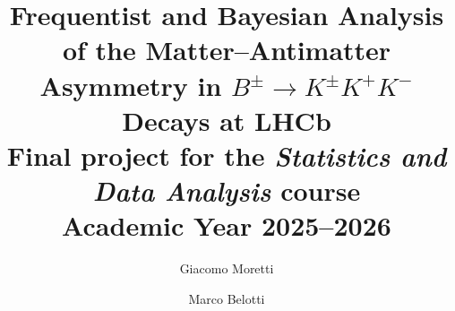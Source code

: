 \documentclass[%
 reprint,
 nofootinbib,
 amsmath,amssymb,
 aps,
 floatfix,
]{revtex4-2}
\begin{document}
\pagestyle{plain}

\title{Frequentist and Bayesian Analysis of the Matter--Antimatter Asymmetry in $B^{\pm} \to K^{\pm} K^{+} K^{-}$ Decays at LHCb\\[2.0ex]
\small Final project for the \textit{Statistics and Data Analysis} course\\
\small Academic Year 2025--2026}

\author{Giacomo Moretti}
\author{Marco Belotti}



\maketitle














\end{document}
